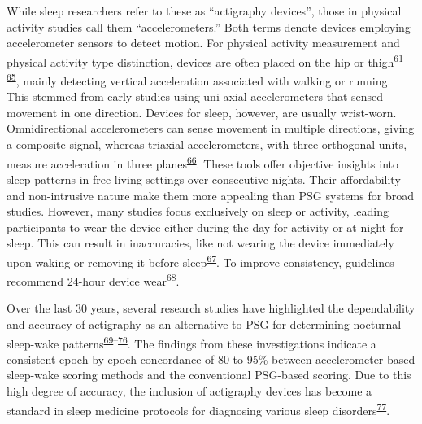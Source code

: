 \documentclass[
  10pt,
]{scrbook}
\begin{document}
While sleep researchers refer to these as ``actigraphy devices'', those
in physical activity studies call them ``accelerometers.'' Both terms
denote devices employing accelerometer sensors to detect motion. For
physical activity measurement and physical activity type distinction,
devices are often placed on the hip or
thigh\textsuperscript{\protect\hyperlink{ref-migueles_accelerometer_2017}{61}--\protect\hyperlink{ref-arvidsson_re-examination_2019}{65}},
mainly detecting vertical acceleration associated with walking or
running. This stemmed from early studies using uni-axial accelerometers
that sensed movement in one direction. Devices for sleep, however, are
usually wrist-worn. Omnidirectional accelerometers can sense movement in
multiple directions, giving a composite signal, whereas triaxial
accelerometers, with three orthogonal units, measure acceleration in
three planes\textsuperscript{\protect\hyperlink{ref-chen_2005}{66}}.
These tools offer objective insights into sleep patterns in free-living
settings over consecutive nights. Their affordability and non-intrusive
nature make them more appealing than PSG systems for broad studies.
However, many studies focus exclusively on sleep or activity, leading
participants to wear the device either during the day for activity or at
night for sleep. This can result in inaccuracies, like not wearing the
device immediately upon waking or removing it before
sleep\textsuperscript{\protect\hyperlink{ref-meredith-jones_2016}{67}}.
To improve consistency, guidelines recommend 24-hour device
wear\textsuperscript{\protect\hyperlink{ref-tudor-locke_2012}{68}}.

Over the last 30 years, several research studies have highlighted the
dependability and accuracy of actigraphy as an alternative to PSG for
determining nocturnal sleep-wake
patterns\textsuperscript{\protect\hyperlink{ref-sadeh_activity-based_1994}{69}--\protect\hyperlink{ref-granovsky_actigraphy-based_2018}{76}}.
The findings from these investigations indicate a consistent
epoch-by-epoch concordance of 80 to 95\% between accelerometer-based
sleep-wake scoring methods and the conventional PSG-based scoring. Due
to this high degree of accuracy, the inclusion of actigraphy devices has
become a standard in sleep medicine protocols for diagnosing various
sleep disorders\textsuperscript{\protect\hyperlink{ref-smith_2018}{77}}.
\end{document}
